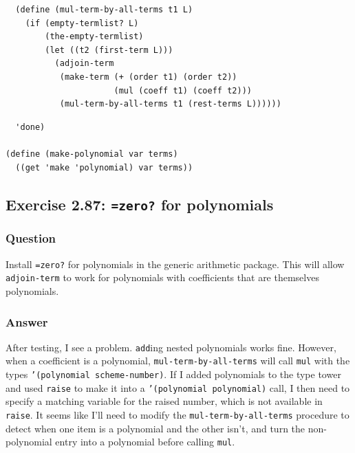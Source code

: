 \documentclass[final,fleqn,titlepage,twoside]{article}
\begin{document}
\begin{verbatim}
  (define (mul-term-by-all-terms t1 L)
    (if (empty-termlist? L)
        (the-empty-termlist)
        (let ((t2 (first-term L)))
          (adjoin-term
           (make-term (+ (order t1) (order t2))
                      (mul (coeff t1) (coeff t2)))
           (mul-term-by-all-terms t1 (rest-terms L))))))
\end{verbatim}
\begin{verbatim}
  'done)

(define (make-polynomial var terms)
  ((get 'make 'polynomial) var terms))
\end{verbatim}

\subsection{Exercise 2.87: \texttt{=zero?} for polynomials}
\label{sec:org7336b5d}
\subsubsection{Question}
\label{sec:org15c9b5c}
Install \texttt{=zero?} for polynomials in the generic arithmetic package.
This will allow \texttt{adjoin-term} to work for polynomials with
coefficients that are themselves polynomials.

\subsubsection{Answer}
\label{sec:org9a393f0}
After testing, I see a problem. \texttt{add}ing nested polynomials works
fine. However, when a coefficient is a polynomial,
\texttt{mul-term-by-all-terms} will call \texttt{mul} with the types
\texttt{'(polynomial scheme-number)}. If I added polynomials to the type
tower and used \texttt{raise} to make it into a \texttt{'(polynomial polynomial)} call, I then need to specify a matching variable for the raised
number, which is not available in \texttt{raise}. It seems like I'll need to
modify the \texttt{mul-term-by-all-terms} procedure to detect when one item
is a polynomial and the other isn't, and turn the non-polynomial entry into a
polynomial before calling \texttt{mul}.
\end{document}
